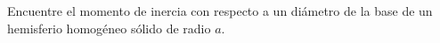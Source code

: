 \item Encuentre el momento de inercia con respecto a un diámetro de la base de un hemisferio homogéneo sólido de radio $a$.
